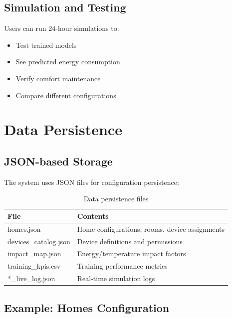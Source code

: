 \documentclass[12pt,a4paper]{article}
\begin{document}
\subsection{Simulation and Testing}

Users can run 24-hour simulations to:
\begin{itemize}[leftmargin=*]
    \item Test trained models
    \item See predicted energy consumption
    \item Verify comfort maintenance
    \item Compare different configurations
\end{itemize}

\section{Data Persistence}

\subsection{JSON-based Storage}

The system uses JSON files for configuration persistence:

\begin{table}[H]
\centering
\begin{tabular}{@{}p{4cm}p{7cm}@{}}
\toprule
\textbf{File} & \textbf{Contents} \\ \midrule
homes.json & Home configurations, rooms, device assignments \\
devices\_catalog.json & Device definitions and permissions \\
impact\_map.json & Energy/temperature impact factors \\
training\_kpis.csv & Training performance metrics \\
*\_live\_log.json & Real-time simulation logs \\ \bottomrule
\end{tabular}
\caption{Data persistence files}
\label{tab:data-files}
\end{table}

\subsection{Example: Homes Configuration}
\end{document}
